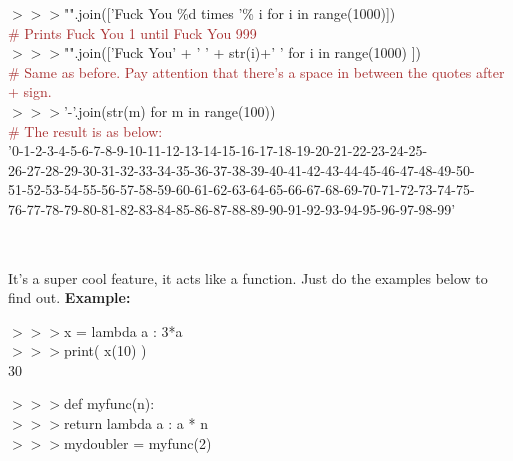 \documentclass[a4paper,18pt]{article}
\begin{document}
$>>>$"".join(['Fuck You \%d times '\% i for i in range(1000)])\\{\textcolor{brown}{\# Prints Fuck You 1 until Fuck You 999}}\\

$>>>$"".join(['Fuck You' + ' ' +  str(i)+' '  for i in range(1000) ])\\{\textcolor{brown}{\# Same as before. Pay attention that there's a space in between the quotes after + sign.}}\\

$>>>$'-'.join(str(m) for m in range(100))\\{\textcolor{brown}{\# The result is as below:}}\\

\hspace{14pt}'0-1-2-3-4-5-6-7-8-9-10-11-12-13-14-15-16-17-18-19-20-21-22-23-24-25-\\
26-27-28-29-30-31-32-33-34-35-36-37-38-39-40-41-42-43-44-45-46-47-48-49-50-\\
51-52-53-54-55-56-57-58-59-60-61-62-63-64-65-66-67-68-69-70-71-72-73-74-75-\\
76-77-78-79-80-81-82-83-84-85-86-87-88-89-90-91-92-93-94-95-96-97-98-99'\\\\



\subsection{\colorbox {matgreen}{\color{white}{\large Lambda Function}}}
It's a super cool feature, it acts like a function. Just do the examples below to find out.
\textbf{Example:\\}

$>>>$x = lambda a : 3*a\\

$>>>$print( x(10) )\\

\hspace*{14pt} 30


$>>>$def myfunc(n):\\

$>>>$\hspace*{14pt}return lambda a : a * n\\

$>>>$mydoubler = myfunc(2)\\
\end{document}
